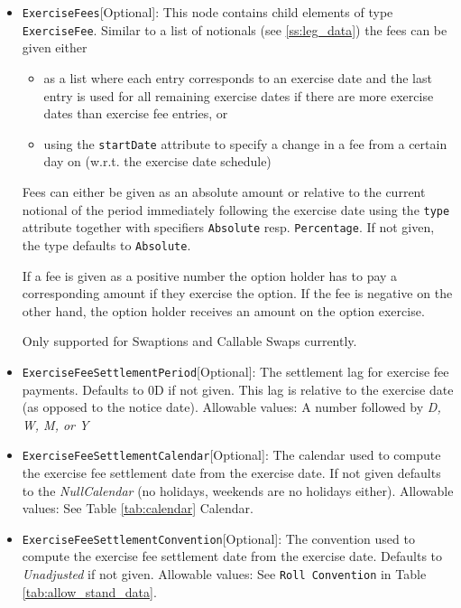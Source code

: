 \begin{itemize}
\item \lstinline!ExerciseFees![Optional]: This node contains child elements of type \lstinline!ExerciseFee!. Similar to a list of notionals
  (see \ref{ss:leg_data}) the fees can be given either

  \begin{itemize}
  \item as a list where each entry corresponds to an exercise date and the last entry is used for all remaining exercise
    dates if there are more exercise dates than exercise fee entries, or
  \item using the \verb+startDate+ attribute to specify a change in a fee from a certain day on (w.r.t. the exercise
    date schedule)
  \end{itemize}

  Fees can either be given as an absolute amount or relative to the current notional of the period immediately following
  the exercise date using the \verb+type+ attribute together with specifiers \verb+Absolute+ resp. \verb+Percentage+. If
  not given, the type defaults to \verb+Absolute+.

  If a fee is given as a positive number the option holder has to pay a corresponding amount if they exercise the
  option. If the fee is negative on the other hand, the option holder receives an amount on the option exercise.

  Only supported for Swaptions and Callable Swaps currently.

\item \lstinline!ExerciseFeeSettlementPeriod![Optional]: The settlement lag for exercise fee payments. Defaults to 0D if not
  given. This lag is relative to the exercise date (as opposed to the notice date). Allowable values: A number followed by \emph{D, W, M, or Y}

\item \lstinline!ExerciseFeeSettlementCalendar![Optional]: The calendar used to compute the exercise fee settlement date from the
  exercise date. If not given defaults to the \emph{NullCalendar} (no holidays, weekends are no holidays either). Allowable values: See Table \ref{tab:calendar} Calendar.

\item \lstinline!ExerciseFeeSettlementConvention![Optional]: The convention used to compute the exercise fee settlement date from
  the exercise date. Defaults to \emph{Unadjusted} if not given. Allowable values: See \lstinline!Roll Convention! in Table \ref{tab:allow_stand_data}.


\end{itemize}
